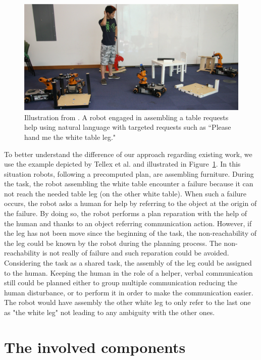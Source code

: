 \begin{figure}[!ht]
\centering
\includegraphics[scale=0.25]{figures/chapter5/tellex.png}
\caption{\label{fig:chap5_tellex} Illustration from \cite{tellex_2014_asking}.
A robot engaged in assembling a table requests help using natural language with targeted requests such as “Please hand me the white table leg." }
\end{figure}

To better understand the difference of our approach regarding existing work, we use the example depicted by Tellex et al. \cite{tellex_2014_asking} and illustrated in Figure~\ref{fig:chap5_tellex}. In this situation robots, following a precomputed plan, are assembling furniture. During the task, the robot assembling the white table encounter a failure because it can not reach the needed table leg (on the other white table). When such a failure occurs, the robot asks a human for help by referring to the object at the origin of the failure. By doing so, the robot performs a plan reparation with the help of the human and thanks to an object referring communication action. However, if the leg has not been move since the beginning of the task, the non-reachability of the leg could be known by the robot during the planning process. The non-reachability is not really of failure and such reparation could be avoided. Considering the task as a shared task, the assembly of the leg could be assigned to the human. Keeping the human in the role of a helper, verbal communication still could be planned either to group multiple communication reducing the human disturbance, or to perform it in order to make the communication easier. The robot would have assembly the other white leg to only refer to the last one as "the white leg" not leading to any ambiguity with the other ones.


\section{The involved components}

